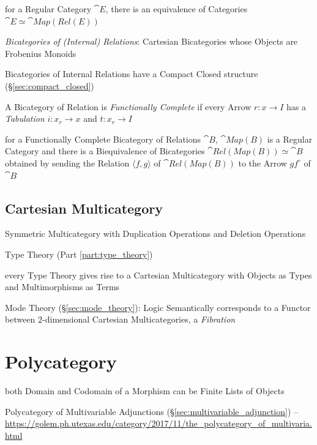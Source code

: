 for a Regular Category $\cat{E}$, there is an equivalence of Categories
$\cat{E} \simeq \cat{Map(Rel(E))}$

\emph{Bicategories of (Internal) Relations}: Cartesian Bicategories whose
Objects are Frobenius Monoids

Bicategories of Internal Relations have a Compact Closed structure
(\S\ref{sec:compact_closed})

A Bicategory of Relation is \emph{Functionally Complete} if every Arrow $r : x
\rightarrow I$ has a \emph{Tabulation} $i : x_r \rightarrow x$ and $t : x_r
\rightarrow I$

for a Functionally Complete Bicategory of Relations $\cat{B}$, $\cat{Map(B)}$
is a Regular Category and there is a Biequivalence of Bicategories
$\cat{Rel(Map(B))} \simeq \cat{B}$ obtained by sending the Relation
$\langle{f,g}\rangle$ of $\cat{Rel(Map(B))}$ to the Arrow $gf^\circ$ of
$\cat{B}$



\subsection{Cartesian Multicategory}\label{sec:cartesian_multicategory}

Symmetric Multicategory with Duplication Operations and Deletion
Operations

Type Theory (Part \ref{part:type_theory})

every Type Theory gives rise to a Cartesian Multicategory with Objects
as Types and Multimorphisms as Terms

Mode Theory (\S\ref{sec:mode_theory}): Logic Semantically corresponds
to a Functor between $2$-dimensional Cartesian Multicategories, a
\emph{Fibration}



\section{Polycategory}\label{sec:polycategory}

both Domain and Codomain of a Morphism can be Finite Lists of Objects

Polycategory of Multivariable Adjunctions
(\S\ref{sec:multivariable_adjunction}) --
\url{https://golem.ph.utexas.edu/category/2017/11/the_polycategory_of_multivaria.html}

